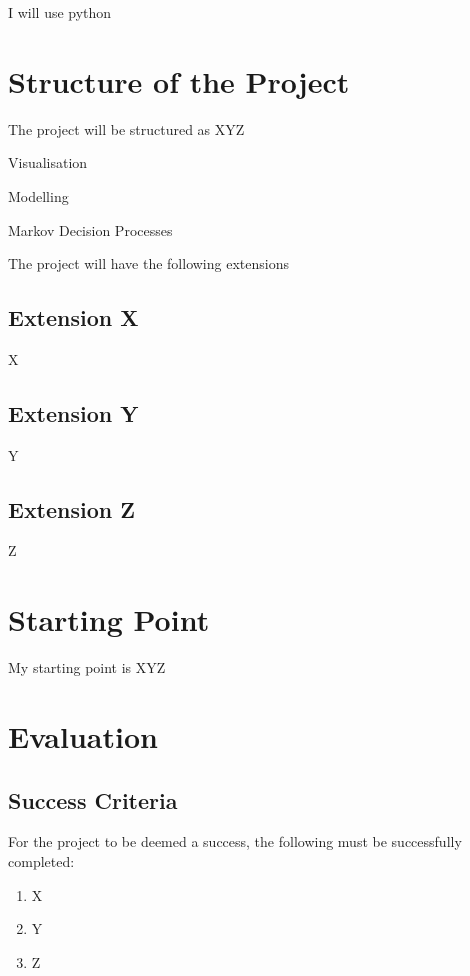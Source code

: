 \documentclass[12pt,a4paper,twoside]{article}
\begin{document}
I will use python 

\section{Structure of the Project}

The project will be structured as XYZ

Visualisation

Modelling 

Markov Decision Processes 

The project will have the following extensions

\subsection*{Extension X}

X

\subsection*{Extension Y}

Y

\subsection*{Extension Z}

Z


\newpage


\section{Starting Point}

My starting point is XYZ


\section{Evaluation}

\subsection{Success Criteria}

For the project to be deemed a success, the following must be successfully completed:

\begin{enumerate}
  \item X
  \item Y
  \item Z
\end{enumerate}
\end{document}
